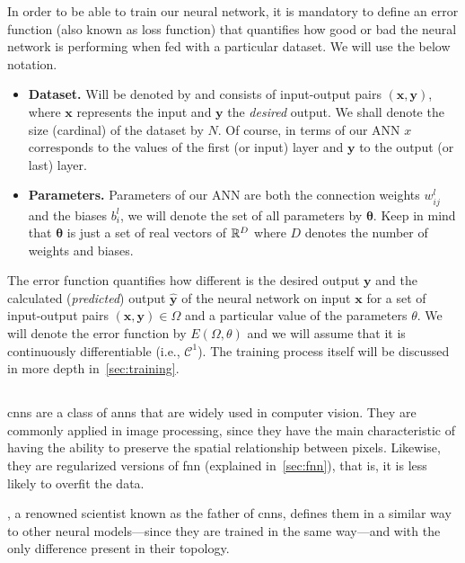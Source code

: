 In order to be able to train our neural network, it is mandatory to define an
error function (also known as loss function) that quantifies how good or bad
the neural network is performing when fed with a particular dataset. We will
use the below notation.
\begin{itemize}
  \item \textbf{Dataset.} Will be denoted by and consists of input-output pairs
  \((\mathbf{x}, \mathbf{y})\), where \(\mathbf{x}\) represents the input and
  \(\mathbf{y}\) the \emph{desired} output. We shall denote the size (cardinal)
  of the dataset by \(N\). Of course, in terms of our ANN \(x\) corresponds to
  the values of the first (or input) layer and \(\mathbf{y}\) to the output (or
  last) layer.
  \item \textbf{Parameters.} Parameters of our ANN are both the connection
  weights \(w_{ij}^l\) and the biases \(b_i^l\), we will denote the set of all
  parameters by \(\bm{\theta}\). Keep in mind that \(\bm{\theta}\) is just a
  set of real vectors of \(\mathbb{R}^D\) where \(D\) denotes the number of weights and
  biases.
\end{itemize}

The error function quantifies how different is the desired output
\(\mathbf{y}\) and the calculated (\emph{predicted}) output
\(\mathbf{\hat{y}}\) of the neural network on input \(\mathbf{x}\) for a set of
input-output pairs \((\mathbf{x} , \mathbf{y}) \in \Omega\) and a particular
value of the parameters \(\theta\). We will denote the error function by
\(E (\Omega, \theta)\) and we will assume that it is continuously
differentiable (i.e., \(\mathcal{C}^1\)). The training process itself will be
discussed in more depth in\ \vref{sec:training}.


\subsection{}%
\label{sec:conv-neur-netw}

\glspl{cnn} are a class of \glspl{ann} that are widely used in computer
vision. They are commonly applied in image processing,
since they have the main characteristic of having the ability to preserve the
spatial relationship between pixels. Likewise, they are regularized versions of
\gls{fnn} (explained in\ \vref{sec:fnn}), that is, it is less likely to overfit
the data.

, a renowned scientist known as the father of
\glspl{cnn}, defines them in a similar way to other neural models---since they
are trained in the same way---and with the only difference present in their
topology.

